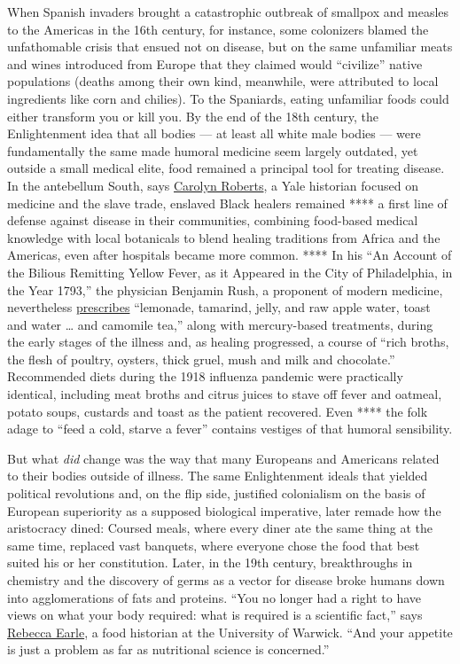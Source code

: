 When Spanish invaders brought a catastrophic outbreak of smallpox and
measles to the Americas in the 16th century, for instance, some
colonizers blamed the unfathomable crisis that ensued not on disease,
but on the same unfamiliar meats and wines introduced from Europe that
they claimed would ``civilize'' native populations (deaths among their
own kind, meanwhile, were attributed to local ingredients like corn and
chilies). To the Spaniards, eating unfamiliar foods could either
transform you or kill you. By the end of the 18th century, the
Enlightenment idea that all bodies --- at least all white male bodies
--- were fundamentally the same made humoral medicine seem largely
outdated, yet outside a small medical elite, food remained a principal
tool for treating disease. In the antebellum South, says
\href{https://afamstudies.yale.edu/people/carolyn-roberts}{Carolyn
Roberts}, a Yale historian focused on medicine and the slave trade,
enslaved Black healers remained **** a first line of defense against
disease in their communities, combining food-based medical knowledge
with local botanicals to blend healing traditions from Africa and the
Americas, even after hospitals became more common. **** In his ``An
Account of the Bilious Remitting Yellow Fever, as it Appeared in the
City of Philadelphia, in the Year 1793,'' the physician Benjamin Rush, a
proponent of modern medicine, nevertheless
\href{https://collections.nlm.nih.gov/catalog/nlm:nlmuid-2569009R-bk}{prescribes}
``lemonade, tamarind, jelly, and raw apple water, toast and water
\ldots{} and camomile tea,'' along with mercury-based treatments, during
the early stages of the illness and, as healing progressed, a course of
``rich broths, the flesh of poultry, oysters, thick gruel, mush and milk
and chocolate.'' Recommended diets during the 1918 influenza pandemic
were practically identical, including meat broths and citrus juices to
stave off fever and oatmeal, potato soups, custards and toast as the
patient recovered. Even **** the folk adage to ``feed a cold, starve a
fever'' contains vestiges of that humoral sensibility.

But what \emph{did} change was the way that many Europeans and Americans
related to their bodies outside of illness. The same Enlightenment
ideals that yielded political revolutions and, on the flip side,
justified colonialism on the basis of European superiority as a supposed
biological imperative, later remade how the aristocracy dined: Coursed
meals, where every diner ate the same thing at the same time, replaced
vast banquets, where everyone chose the food that best suited his or her
constitution. Later, in the 19th century, breakthroughs in chemistry and
the discovery of germs as a vector for disease broke humans down into
agglomerations of fats and proteins. ``You no longer had a right to have
views on what your body required: what is required is a scientific
fact,'' says
\href{https://warwick.ac.uk/fac/arts/history/people/staff_index/earle/}{Rebecca
Earle}, a food historian at the University of Warwick. ``And your
appetite is just a problem as far as nutritional science is concerned.''

